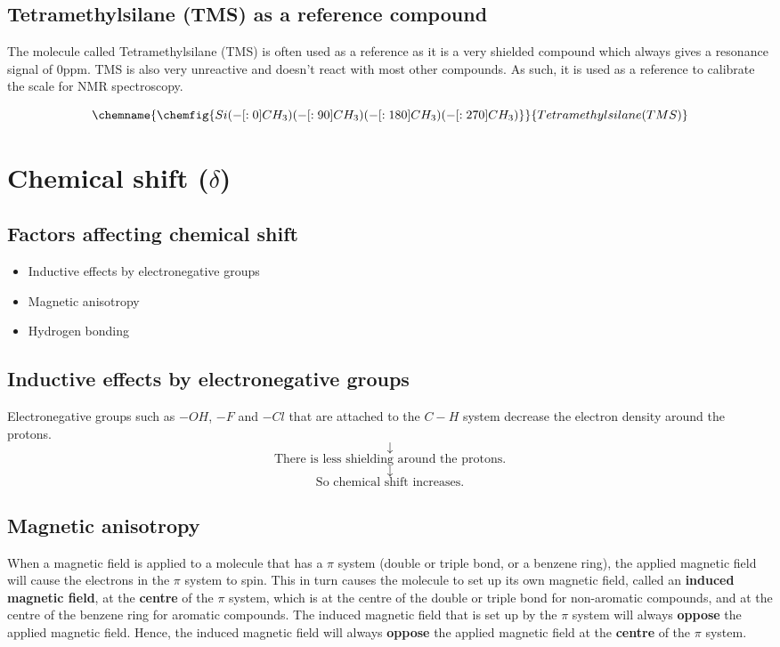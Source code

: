 \documentclass[11pt]{article}
\begin{document}
\subsection{Tetramethylsilane (TMS) as a reference compound}
\label{sec:org4db9cec}
The molecule called Tetramethylsilane (TMS) is often used as a reference as it is a very shielded compound which always gives a resonance signal of 0ppm. TMS is also very unreactive and doesn't react with most other compounds. As such, it is used as a reference to calibrate the scale for NMR spectroscopy.

\[
\chemname{
\chemfig{Si(-[:0]CH_3)(-[:90]CH_3)(-[:180]CH_3)(-[:270]CH_3)}
}{Tetramethylsilane (TMS)}
\]
\section{Chemical shift (\(\delta\))}
\label{sec:org1b27a43}

\subsection{Factors affecting chemical shift}
\label{sec:orge237901}
\begin{itemize}
\item Inductive effects by electronegative groups
\item Magnetic anisotropy
\item Hydrogen bonding
\end{itemize}
\subsection{Inductive effects by electronegative groups}
\label{sec:orgffdc0d7}
Electronegative groups such as \(-OH\), \(-F\) and \(-Cl\) that are attached to the \(C-H\) system decrease the electron density around the protons.
\[\downarrow\]
\[\text{There is less shielding around the protons.}\]
\[\downarrow\]
\[\text{So chemical shift increases.}\]

\newpage
\subsection{Magnetic anisotropy}
\label{sec:org637b9a3}
When a magnetic field is applied to a molecule that has a \(\pi\) system (double or triple bond, or a benzene ring), the applied magnetic field will cause the electrons in the \(\pi\) system to spin. This in turn causes the molecule to set up its own magnetic field, called an \textbf{induced magnetic field}, at the \textbf{centre} of the \(\pi\) system, which is at the centre of the double or triple bond for non-aromatic compounds, and at the centre of the benzene ring for aromatic compounds. The induced magnetic field that is set up by the \(\pi\) system will always \textbf{oppose} the applied magnetic field. Hence, the induced magnetic field will always \textbf{oppose} the applied magnetic field at the \textbf{centre} of the \(\pi\) system.
\end{document}
